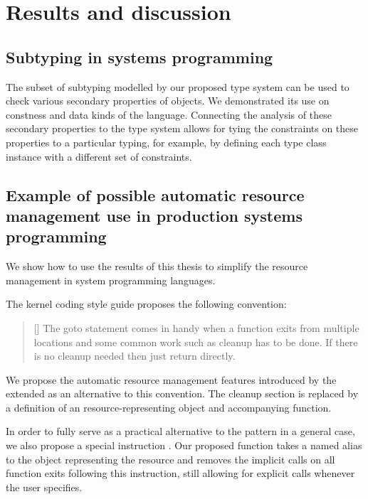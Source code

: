 \chapter{Results and discussion}

\section{Subtyping in systems programming}

The subset of subtyping modelled by our proposed type system can be used to check various secondary properties of objects. We demonstrated its use on constness and data kinds of the \cmm language. Connecting the analysis of these secondary properties to the type system allows for tying the constraints on these properties to a particular typing, for example, by defining each type class instance with a different set of constraints.

\section{Example of possible automatic resource management use in production systems programming}

We show how to use the results of this thesis to simplify the resource management in system programming languages.

The kernel coding style guide proposes the following convention:

\begin{quotation}[]
  The goto statement comes in handy when a function exits from multiple locations and some common work such as cleanup has to be done. If there is no cleanup needed then just return directly.
\end{quotation}

We propose the automatic resource management features introduced by the extended \cmm{} as an alternative to this convention. The cleanup section is replaced by a definition of an resource-representing object and accompanying  function.

In order to fully serve as a practical alternative to the  pattern in a general case, we also propose a special instruction . Our proposed  function takes a named alias to the object representing the resource and removes the implicit calls on all function exits following this instruction, still allowing for explicit calls whenever the user specifies.

